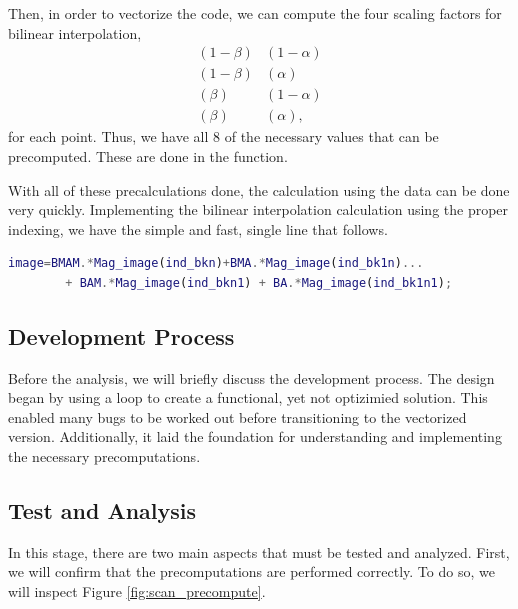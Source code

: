 Then, in order to vectorize the code, we can compute the four scaling factors for bilinear interpolation,
\begin{align*}
    (1-\beta)&(1-\alpha) \\
    (1-\beta)&(\alpha) \\
    (\beta)&(1-\alpha) \\
    (\beta)&(\alpha),
\end{align*}
for each point.  Thus, we have all $8$ of the necessary values that can be precomputed.  These are done in the  function.

With all of these precalculations done, the calculation using the  data can be done very quickly.  Implementing the bilinear interpolation calculation using the proper indexing, we have the simple and fast, single line that follows.

\begin{lstlisting}[language=Matlab]
    image=BMAM.*Mag_image(ind_bkn)+BMA.*Mag_image(ind_bk1n)...
        + BAM.*Mag_image(ind_bkn1) + BA.*Mag_image(ind_bk1n1);
\end{lstlisting}



\subsection{Development Process}

Before the analysis, we will briefly discuss the development process.  The design began by using a  loop to create a functional, yet not optizimied solution.  This enabled many bugs to be worked out before transitioning to the vectorized version.  Additionally, it laid the foundation for understanding and implementing the necessary precomputations.

\subsection{Test and Analysis}

In this stage, there are two main aspects that must be tested and analyzed.  First, we will confirm that the precomputations are performed correctly.  To do so, we will inspect Figure \ref{fig:scan_precompute}.

